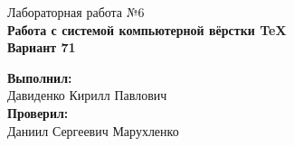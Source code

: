 \thispagestyle{fancy}
\vspace*{4cm}

\begin{center}
    \Large
    Лабораторная работа №6\\
    \textbf{Работа с системой компьютерной вёрстки \TeX} \\[1cm]
    \textbf{Вариант 71}
\end{center}

\vfill

\hfill
\begin{minipage}{0.4\textwidth}
    \raggedleft
    \textbf{Выполнил:} \\
    Давиденко Кирилл Павлович \\[0.5cm]
    \textbf{Проверил:} \\
    Даниил Сергеевич Марухленко
\end{minipage}
\vspace*{2cm}